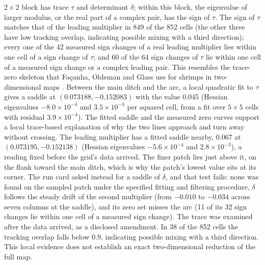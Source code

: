 \documentclass[11pt,letterpaper]{article}
\begin{document}
$2\times2$ block has trace $\tau$ and determinant $\delta$; within this block, the eigenvalue of larger modulus,
or the real part of a complex pair, has the sign of $\tau$. The sign of $\tau$ matches that of the leading multiplier in
849 of the 852 cells (the other three have low tracking overlap, indicating possible mixing with a third direction); every one of
the 42 measured sign changes of a real leading multiplier lies within one cell of a sign change of $\tau$; and 60 of the
64 sign changes of $\tau$ lie within one cell of a measured sign change or a complex leading pair. This resembles
the trace-zero skeleton that Fa\c{c}anha, Oldeman and Glass use for
shrimps in two-dimensional maps \cite{facanha2013endoskeletons}. Between the main ditch and the arc, a local quadratic fit to $\tau$ gives a saddle
at $(0.073188,-0.152083)$ with the value 0.045 (Hessian eigenvalues $-8.0\times10^{-4}$ and $3.5\times10^{-3}$ per
squared cell, from a fit over $5\times5$ cells with residual $3.9\times10^{-4}$).
The fitted saddle and the measured zero curves support a local trace-based explanation of why the two lines approach and turn away
without crossing. The leading multiplier has a fitted saddle nearby, 0.067 at $(0.073195,-0.152138)$ (Hessian eigenvalues
$-5.6\times10^{-4}$ and $2.8\times10^{-3}$), a reading fixed before the grid's data arrived. The finer patch lies just
above it, on the flank toward the main ditch, which is why the patch's lowest value sits at its corner. The run card
asked instead for a saddle of $\delta$, and that test fails: none was found on the sampled patch under the specified fitting and filtering procedure,
$\delta$ follows the steady drift of the second multiplier (from $-0.010$ to $-0.034$ across seven columns at the
saddle), and its zero set misses the arc (11 of its 32 sign changes lie within one cell of a measured sign change). The
trace was examined after the data arrived, as a disclosed amendment. In 38 of the 852 cells the tracking overlap falls
below 0.9, indicating possible mixing with a third direction. This local evidence does not establish an exact
two-dimensional reduction of the full map.
\end{document}
